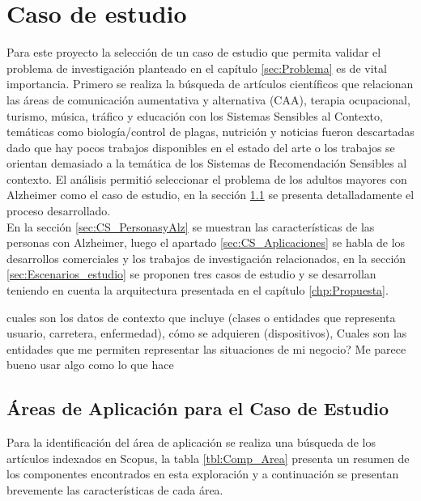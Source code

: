 \chapter{Caso de estudio}
\label{chp:CS}

Para este proyecto la selección de un caso de estudio que permita validar el problema de investigación planteado en el capítulo \ref{sec:Problema} es de vital importancia. Primero se realiza la búsqueda de artículos científicos que relacionan las áreas de comunicación aumentativa y alternativa (CAA), terapia ocupacional, turismo, música, tráfico y educación con los Sistemas Sensibles al Contexto, temáticas como biología/control de plagas, nutrición y noticias fueron descartadas dado que hay pocos trabajos disponibles en el estado del arte o los trabajos se orientan demasiado a la temática de los Sistemas de Recomendación Sensibles al contexto. El análisis permitió seleccionar el problema de los adultos mayores con Alzheimer como el caso de estudio, en la sección \ref{sec:CS_Comparacion} se presenta detalladamente el proceso desarrollado.\\

En la sección \ref{sec:CS_PersonasyAlz} se muestran las características de las personas con Alzheimer, luego el apartado \ref{sec:CS_Aplicaciones} se habla de los desarrollos comerciales y los trabajos de investigación relacionados, en la sección \ref{sec:Escenarios_estudio} se proponen tres casos de estudio y se desarrollan teniendo en cuenta la arquitectura presentada en el capítulo \ref{chp:Propuesta}.


cuales son los datos de contexto que incluye (clases o entidades que representa usuario, carretera, enfermedad), cómo se adquieren (dispositivos), Cuales son las entidades que me permiten representar las situaciones de mi negocio?
Me parece bueno usar algo como lo que hace \cite{Chang2017}



\section{Áreas de Aplicación para el Caso de Estudio}
\label{sec:CS_Comparacion}

Para la identificación del área de aplicación se realiza una búsqueda de los artículos indexados en Scopus, la tabla \ref{tbl:Comp_Area} presenta un resumen de los componentes encontrados en esta exploración y a continuación se presentan brevemente las características de cada área.\\



